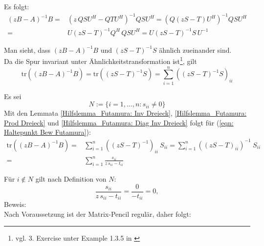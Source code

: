 \documentclass[a4paper,12pt]{report}
\newcommand{\tr}{\text{tr}}
\newcommand{\inv}{^{-1}}
\newcommand{\1}{\mathds{1}}
\theoremstyle{plain} %
\theoremstyle{definition} %
\theoremstyle{remark}
\begin{document}

            Es folgt:
            \begin{align*}
                  (zB-A)\inv B =& (z\,QSU^H-QTU^H)\inv QSU^H = (Q(zS-T)U^H)\inv QSU^H \\
                  =& U(zS-T)\inv Q^H\,QSU^H = U(zS-T)\inv S\,U\inv
            \end{align*}

            Man sieht, dass $(zB-A)\inv B$ und  $(zS-T)\inv S$ ähnlich zueinander sind.\\
            Da die Spur invariant unter Ähnlichkeitstransformation ist\footnote{vgl. 3. Exercise unter Example 1.3.5 in \cite{matrixSpur}}, gilt
            \begin{equation}
                  \label{eqn: Haltepunkt Bew Futamura}
                  \tr((zB-A)\inv B) = \tr((zS-T)\inv S) = \sum_{i=1}^{n}((zS-T)\inv S)_{ii}
            \end{equation}

            Es sei $$N:=\{i=1,\dots,n: s_{ii}\ne 0\}$$
            Mit den Lemmata \ref{Hilfslemma_Futamura: Inv Dreieck}, \ref{Hilfslemma_Futamura: Prod Dreieck} und \ref{Hilfslemma_Futamura: Diag Inv Dreieck} folgt für (\ref{eqn: Haltepunkt Bew Futamura}):
            \begin{align*}
                  \tr((zB-A)\inv B) =& \sum_{i=1}^{n}((zS-T)\inv)_{ii}\ S_{ii} = \sum_{i=1}^{n}((zS-T)_{ii})\inv\ S_{ii}\\
                  =& \sum_{i=1}^{n}\frac{s_{ii}}{z\,s_{ii}-t_{ii}}
            \end{align*}

            Für $i\notin N$ gilt nach Definition von $N$:
            $$\frac{s_{ii}}{z\,s_{ii}-t_{ii}} = \frac 0 {-t_{ii}} = 0,$$
            Beweis:\\
            Nach Voraussetzung ist der Matrix-Pencil regulär, daher folgt:
\end{document}
